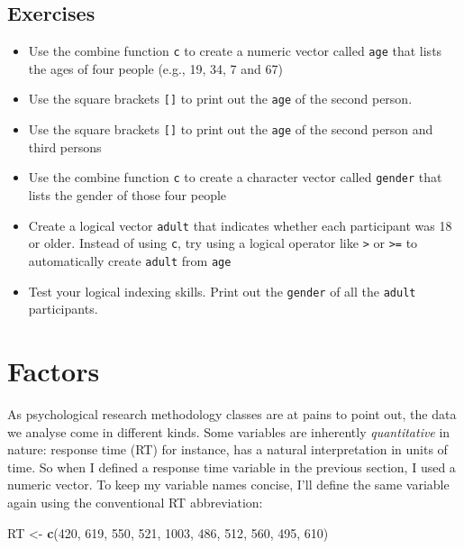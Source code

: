 \documentclass[]{book}
\newenvironment{Shaded}{\begin{snugshade}}{\end{snugshade}}
\newcommand{\DecValTok}[1]{\textcolor[rgb]{0.00,0.00,0.81}{#1}}
\newcommand{\KeywordTok}[1]{\textcolor[rgb]{0.13,0.29,0.53}{\textbf{#1}}}
\newcommand{\NormalTok}[1]{#1}
\newcommand{\StringTok}[1]{\textcolor[rgb]{0.31,0.60,0.02}{#1}}
\providecommand{\tightlist}{%
  \setlength{\itemsep}{0pt}\setlength{\parskip}{0pt}}
\begin{document}
\hypertarget{exercises-1}{%
\subsection{Exercises}\label{exercises-1}}

\begin{itemize}
\tightlist
\item
  Use the combine function \texttt{c} to create a numeric vector called \texttt{age} that lists the ages of four people (e.g., 19, 34, 7 and 67)
\item
  Use the square brackets \texttt{{[}{]}} to print out the \texttt{age} of the second person.
\item
  Use the square brackets \texttt{{[}{]}} to print out the \texttt{age} of the second person and third persons
\item
  Use the combine function \texttt{c} to create a character vector called \texttt{gender} that lists the gender of those four people
\item
  Create a logical vector \texttt{adult} that indicates whether each participant was 18 or older. Instead of using \texttt{c}, try using a logical operator like \texttt{\textgreater{}} or \texttt{\textgreater{}=} to automatically create \texttt{adult} from \texttt{age}
\item
  Test your logical indexing skills. Print out the \texttt{gender} of all the \texttt{adult} participants.
\end{itemize}

\hypertarget{factors}{%
\section{Factors}\label{factors}}

As psychological research methodology classes are at pains to point out, the data we analyse come in different kinds. Some variables are inherently \emph{quantitative} in nature: response time (RT) for instance, has a natural interpretation in units of time. So when I defined a response time variable in the previous section, I used a numeric vector. To keep my variable names concise, I'll define the same variable again using the conventional RT abbreviation:

\begin{Shaded}
\begin{Highlighting}[]
\NormalTok{RT <-}\StringTok{ }\KeywordTok{c}\NormalTok{(}\DecValTok{420}\NormalTok{, }\DecValTok{619}\NormalTok{, }\DecValTok{550}\NormalTok{, }\DecValTok{521}\NormalTok{, }\DecValTok{1003}\NormalTok{, }\DecValTok{486}\NormalTok{, }\DecValTok{512}\NormalTok{, }\DecValTok{560}\NormalTok{, }\DecValTok{495}\NormalTok{, }\DecValTok{610}\NormalTok{)}
\end{Highlighting}
\end{Shaded}
\end{document}
